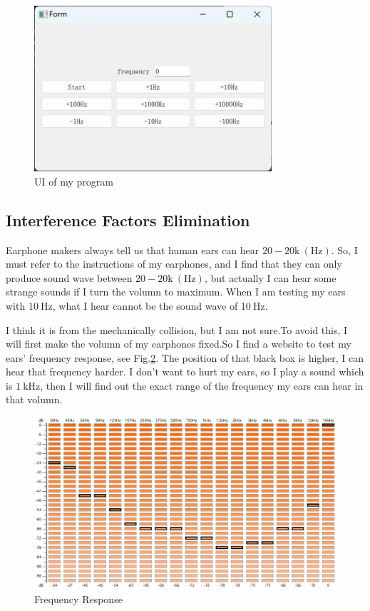 \documentclass{article}
\begin{document}
\begin{figure}[htbp]
    \centering
    \includegraphics[keepaspectratio,width=250pt]{FreqWindow.jpg}
    \caption{UI of my program}\label{UI}
\end{figure}

\subsection{Interference Factors Elimination}
Earphone makers always tell us that human ears can hear $20-20\mathrm{k}~\mathrm{(Hz)}$. So, I must refer to the instructions of my earphones, and I find that they can only produce sound wave between $20-20\mathrm{k}~\mathrm{(Hz)}$, but actually I can hear some strange sounds if I turn the volumn to maximum. When I am testing my ears with 10$~\mathrm{Hz}$, what I hear cannot be the sound wave of 10$~\mathrm{Hz}$. 

I think it is from the mechanically collision, but I am not sure.To avoid this, I will first make the volumn of my earphones fixed.So I find a website\cite{HearingTest} to test my ears' frequency response, see Fig.\ref{FR}. The position of that black box is higher, I can hear that frequency harder. I don't want to hurt my ears, so I play a sound which is $1\mathrm{~kHz}$, then I will find out the exact range of the frequency my ears can hear in that volumn.

\begin{figure}[htbp]
    \centering
    \includegraphics[keepaspectratio,width=400pt]{freqReaction.jpg}
    \caption{Frequency Response}
    \label{FR}
\end{figure}
\end{document}
